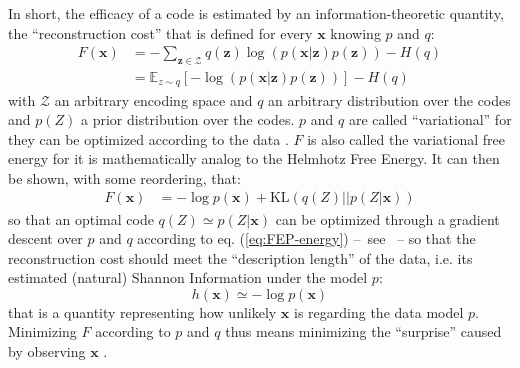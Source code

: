 \documentclass[12pt,twoside,openright]{article}
\begin{document}
In short, the efficacy of a code is estimated by an information-theoretic quantity, the ``reconstruction cost'' that is defined for every $\boldsymbol{x}$ knowing $p$ and $q$:
\begin{align}
F(\boldsymbol{x}) &= - \sum_{\boldsymbol{z} \in \mathcal{Z}} q(\boldsymbol{z}) \log (p(\boldsymbol{x}|\boldsymbol{z})p(\boldsymbol{z})) - H(q)\nonumber\\
&= \mathbb{E}_{z\sim q} \left[-\log (p(\boldsymbol{x}|\boldsymbol{z})p(\boldsymbol{z}))\right] - H(q)
\label{eq:FEP-energy}
\end{align}
with $\mathcal{Z}$ an arbitrary encoding space and $q$ an arbitrary distribution over the codes and $p(Z)$ a prior distribution over the codes.
$p$ and $q$ are called ``variational'' for they can be optimized according to the data \cite{hinton2006fast,kingma2013auto}.  
$F$ is also called the variational free energy for it is mathematically analog to the Helmhotz Free Energy.
It can then be shown, with some reordering, that:
\begin{align}
F(\boldsymbol{x}) 
&= - \log p(\boldsymbol{x}) + \text{KL}(q(Z)||p(Z|\boldsymbol{x}))
\label{eq:FEP}
\end{align}
so that an optimal code $q(Z)\simeq p(Z|\boldsymbol{x})$ can be optimized through a gradient descent over $p$ and $q$ according to eq. (\ref{eq:FEP-energy}) --~see \cite{kingma2013auto}~-- so that the reconstruction cost should meet the ``description length'' of the data, i.e. its estimated (natural) Shannon Information under the model $p$:
$$h(\boldsymbol{x}) \simeq -\log p(\boldsymbol{x}) %
$$
that is a quantity representing how unlikely $\boldsymbol{x}$ is regarding the data model $p$. Minimizing $F$ according to $p$ and $q$ thus means minimizing the ``surprise'' caused by observing $\boldsymbol{x}$ \cite{friston2010free}.
 
 
 
\end{document}
